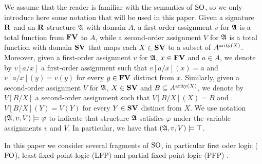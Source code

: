 We assume that the reader is familiar with the semantics of ${\rm SO}$, so we only introduce here some notation that will be used in this paper. 
Given a signature $\mathbf{R}$ and an $\mathbf{R}$-structure $\mathfrak{A}$ with domain $A$, a first-order assignment $v$ for $\mathfrak{A}$ is a total function from $\mathbf{FV}$ to $A$, while a second-order assignment $V$ for $\mathfrak{A}$ is a total function with domain $\mathbf{SV}$ that maps each $X \in \mathbf{SV}$ to a subset of $A^{{\rm arity}(X)}$. Moreover, given a first-order assignment $v$ for $\mathfrak{A}$, $x \in \mathbf{FV}$ and $a \in A$, we denote by $v[a/x]$ a first-order assignment such that $v[a/x](x) = a$ and $v[a/x](y) = v(y)$ for every $y \in \mathbf{FV}$ distinct from $x$. Similarly, given a second-order assignment $V$ for $\mathfrak{A}$, $X \in \mathbf{SV}$ and $B  \subseteq A^{{\rm arity}(X)}$, we denote by $V[B/X]$ a second-order assignment such that $V[B/X](X) = B$ and $V[B/X](Y) = V(Y)$ for every $Y \in \mathbf{SV}$ distinct from $X$. We use notation $(\mathfrak{A}, v, V) \models \varphi$ to indicate that structure $\mathfrak{A}$ satisfies $\varphi$ under the variable assignments $v$ and $V$. In particular, we have that $(\mathfrak{A}, v, V) \models \top$. 

In this paper we consider several fragments of ${\rm SO}$, in particular first oder logic (${\rm FO}$), least fixed point logic (LFP) and partial fixed point logic (PFP) \cite{L04}.

